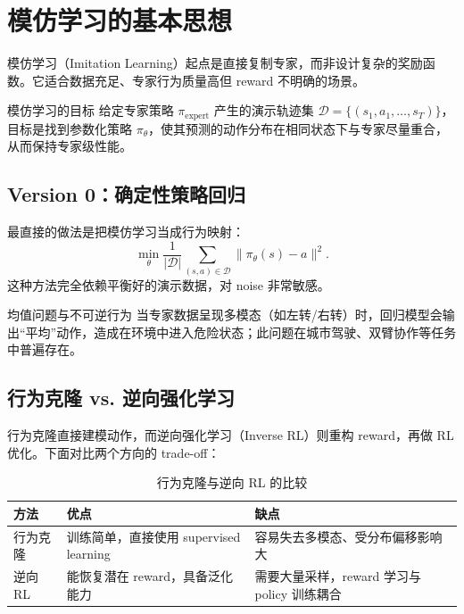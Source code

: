 \section{模仿学习的基本思想}

模仿学习（Imitation Learning）起点是直接复制专家，而非设计复杂的奖励函数。它适合数据充足、专家行为质量高但 reward 不明确的场景。

\begin{importantbox}{模仿学习的目标}
给定专家策略 $\pi_{\text{expert}}$ 产生的演示轨迹集 $\mathcal{D} = \{(s_1,a_1,\ldots,s_T)\}$，目标是找到参数化策略 $\pi_\theta$，使其预测的动作分布在相同状态下与专家尽量重合，从而保持专家级性能。
\end{importantbox}

\subsection{Version 0：确定性策略回归}

最直接的做法是把模仿学习当成行为映射：
$$\min_\theta \frac{1}{|\mathcal{D}|}\sum_{(s,a) \in \mathcal{D}} \|\pi_\theta(s) - a\|^2.$$
这种方法完全依赖平衡好的演示数据，对 noise 非常敏感。

\begin{warningbox}{均值问题与不可逆行为}
当专家数据呈现多模态（如左转/右转）时，回归模型会输出“平均”动作，造成在环境中进入危险状态；此问题在城市驾驶、双臂协作等任务中普遍存在。
\end{warningbox}

\subsection{行为克隆 vs. 逆向强化学习}

行为克隆直接建模动作，而逆向强化学习（Inverse RL）则重构 reward，再做 RL 优化。下面对比两个方向的 trade-off：

\begin{table}[H]
\centering
\begin{tabular}{p{} p{} p{}}
\toprule
方法 & 优点 & 缺点 \\
\midrule
行为克隆 & 训练简单，直接使用 supervised learning & 容易失去多模态、受分布偏移影响大 \\
逆向 RL & 能恢复潜在 reward，具备泛化能力 & 需要大量采样，reward 学习与 policy 训练耦合 \\
\bottomrule
\end{tabular}
\caption{行为克隆与逆向 RL 的比较}
\end{table}

